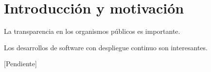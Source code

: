 \chapter{Introducción y motivación}

La transparencia en los organismos públicos es importante.

Los desarrollos de software con despliegue continuo son interesantes.

[Pendiente]